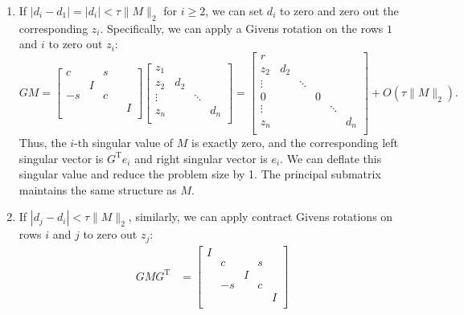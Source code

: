 \documentclass[12pt]{article}
\newcommand{\op}{\operatorname}
\begin{document}
\begin{enumerate}
    \item If \(|d_i - d_1| = |d_i| < \tau \|M\|_2\) for \(i \geq 2\), we can set \(d_i\) to zero and zero out the corresponding \(z_i\). Specifically, we can apply a Givens rotation on the rows \(1\) and \(i\) to zero out \(z_i\):
    \[
        GM = \begin{bmatrix}
            c & & s \\
            & I & \\
            -s & & c \\
            & & & & I \\
        \end{bmatrix}
        \begin{bmatrix}
            z_1 \\
            z_2 & d_2 \\
            \vdots & & \ddots \\
            z_n & & & d_n \\
        \end{bmatrix} = \begin{bmatrix}
            r \\
            z_2 & d_2 \\
            \vdots & & \ddots \\
            0 & & & 0 \\
            \vdots & & & & \ddots \\
            z_n & & & & & d_n \\
        \end{bmatrix} + O(\tau \|M\|_2).
    \]
    Thus, the \(i\)-th singular value of \(M\) is exactly zero, and the corresponding left singular vector is \(G^{\op T} e_i\) and right singular vector is \(e_i\). We can deflate this singular value and reduce the problem size by 1. The principal submatrix maintains the same structure as \(M\).
    \item If \(|d_j - d_i| < \tau \|M\|_2\), similarly, we can apply contract Givens rotations on rows \(i\) and \(j\) to zero out \(z_j\):
    \[
        \begin{aligned}
            G M G^{\op T} &= \begin{bmatrix}
            I & & & & \\
            & c & & s & \\
            & & I & & \\
            & -s & & c & \\
            & & & & I \\

\end{bmatrix}
\end{aligned}\]
\end{enumerate}
\end{document}
